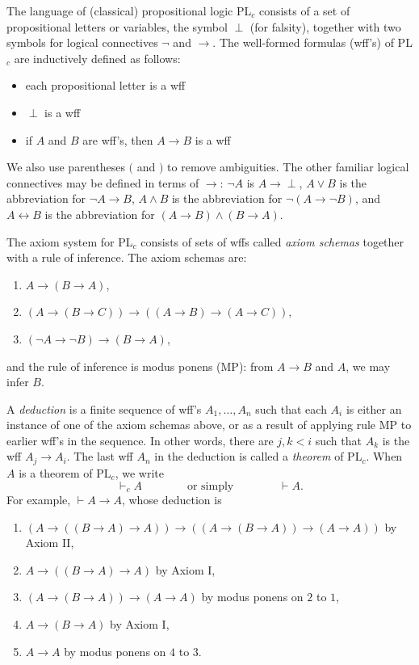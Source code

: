 \documentclass[12pt]{article}
\begin{document}
The language of (classical) propositional logic PL$_c$ consists of a set of propositional letters or variables, the symbol $\perp$ (for falsity), together with two symbols for logical connectives $\neg$ and $\to$.  The well-formed formulas (wff's) of PL$_c$ are inductively defined as follows:
\begin{itemize}
\item each propositional letter is a wff
\item $\perp$ is a wff
\item if $A$ and $B$ are wff's, then $A\to B$ is a wff
\end{itemize}
We also use parentheses $($ and $)$ to remove ambiguities.  The other familiar logical connectives may be defined in terms of $\to$: $\neg A$ is $A\to \perp$, $A\lor B$ is the abbreviation for $\neg A \to B$, $A\land B$ is the abbreviation for $\neg (A\to \neg B)$, and $A \leftrightarrow B$ is the abbreviation for $(A\to B)\land (B\to A)$.

The axiom system for PL$_c$ consists of sets of wffs called \emph{axiom schemas} together with a rule of inference.  The axiom schemas are:
\begin{enumerate}
\item $A\to (B\to A)$,
\item $(A\to (B\to C)) \to ((A\to B)\to (A\to C))$,
\item $(\neg A\to \neg B)\to (B\to A)$,
\end{enumerate}
and the rule of inference is modus ponens (MP): from $A\to B$ and $A$, we may infer $B$.

A \emph{deduction} is a finite sequence of wff's $A_1, \ldots, A_n$ such that each $A_i$ is either an instance of one of the axiom schemas above, or as a result of applying rule MP to earlier wff's in the sequence.  In other words, there are $j,k<i$ such that $A_k$ is the wff $A_j \to A_i$.  The last wff $A_n$ in the deduction is called a \emph{theorem} of PL$_c$.  When $A$ is a theorem of PL$_c$, we write $$\vdash_c A \qquad\qquad \mbox{or simply} \qquad\qquad \vdash A.$$
For example, $\vdash A \to A$, whose deduction is
\begin{enumerate}
\item $(A \to ((B\to A) \to A)) \to ((A \to (B\to A)) \to (A \to A))$ by Axiom II,
\item $A \to ((B \to A) \to A)$ by Axiom I,
\item $(A \to (B\to A)) \to (A \to A)$ by modus ponens on $2$ to $1$,
\item $A\to (B\to A)$ by Axiom I,
\item $A\to A$ by modus ponens on $4$ to $3$.
\end{enumerate}
\end{document}
